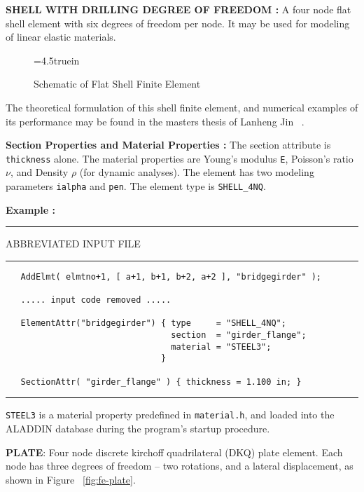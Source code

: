 \vspace{0.35 in}\noindent
{\bf SHELL WITH DRILLING DEGREE OF FREEDOM : }
A four node flat shell element with six degrees of freedom per node.
It may be used for modeling of linear elastic materials.  

\begin{figure} [ht]
\epsfxsize=4.5truein
\centerline{}
\caption{Schematic of Flat Shell Finite Element}
\label{fig:fe-flat-shell}
\end{figure}

\vspace{0.15 in}\noindent
The theoretical formulation of this shell finite element,
and numerical examples of its performance
may be found in the masters thesis of Lanheng Jin ~\cite{jin94}.

\vspace{0.15 in}\noindent
{\bf Section Properties and Material Properties :} 
The section attribute is {\tt thickness} alone.
The material properties are Young's modulus {\tt E},
Poisson's ratio $\nu$, and Density $\rho$ (for dynamic analyses).
The element has two modeling parameters {\tt ialpha} and {\tt pen}.
The element type is {\tt SHELL\_4NQ}.

\vspace{0.15 in}\noindent
{\bf Example :} 

\vspace{0.10 in}
\begin{footnotesize}
\noindent
{\rule{2.1 in}{0.035 in} ABBREVIATED INPUT FILE \rule{2.1 in}{0.035 in} }
\begin{verbatim}
   AddElmt( elmtno+1, [ a+1, b+1, b+2, a+2 ], "bridgegirder" );

   ..... input code removed .....

   ElementAttr("bridgegirder") { type     = "SHELL_4NQ";
                                 section  = "girder_flange";
                                 material = "STEEL3";
                               }

   SectionAttr( "girder_flange" ) { thickness = 1.100 in; }
\end{verbatim}
\rule{6.25 in}{0.035 in}
\end{footnotesize}

\vspace{0.10 in}\noindent
{\tt STEEL3} is a material property predefined in {\tt material.h},
and loaded into the ALADDIN database during the program's startup procedure.

\vspace{0.35 in}\noindent
{\bf PLATE}: Four node discrete kirchoff quadrilateral (DKQ) plate element.
Each node has three degrees of freedom -- two rotations, and a lateral displacement,
as shown in Figure ~\ref{fig:fe-plate}.

